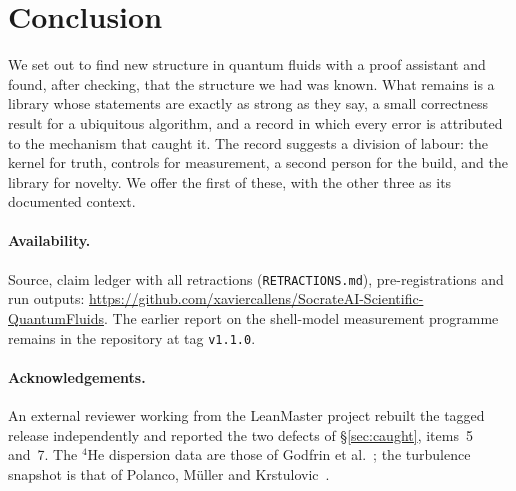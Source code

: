 \documentclass[11pt,a4paper]{article}
\theoremstyle{definition}
\begin{document}
\section{Conclusion}

We set out to find new structure in quantum fluids with a proof assistant and found, after
checking, that the structure we had was known. What remains is a library whose statements
are exactly as strong as they say, a small correctness result for a ubiquitous algorithm,
and a record in which every error is attributed to the mechanism that caught it. The record
suggests a division of labour: the kernel for truth, controls for measurement, a second
person for the build, and the library for novelty. We offer the first of these, with the
other three as its documented context.

\paragraph{Availability.} Source, claim ledger with all retractions
(\texttt{RETRACTIONS.md}), pre-registrations and run outputs:
\url{https://github.com/xaviercallens/SocrateAI-Scientific-QuantumFluids}.
The earlier report on the shell-model measurement programme remains in the repository at
tag \texttt{v1.1.0}.

\paragraph{Acknowledgements.} An external reviewer working from the LeanMaster project
rebuilt the tagged release independently and reported the two defects of
\S\ref{sec:caught}, items~5 and~7. The $^4$He dispersion data are those of Godfrin et
al.~\cite{Godfrin2021}; the turbulence snapshot is that of Polanco, M\"uller and
Krstulovic~\cite{PolancoData}.



\end{document}
